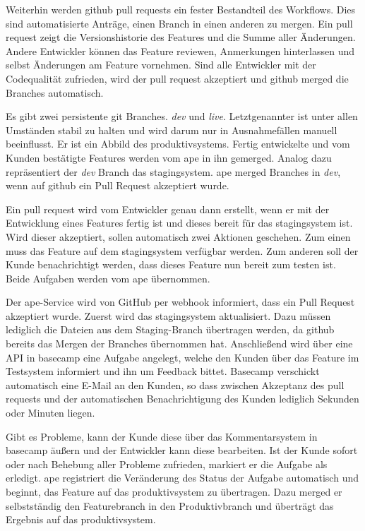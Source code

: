Weiterhin werden \gls{github} \glspl{pull request} ein fester Bestandteil des Workflows. Dies sind automatisierte Anträge, einen Branch in einen anderen zu mergen. Ein \gls{pull request} zeigt die Versionshistorie des Features und die Summe aller Änderungen. Andere Entwickler können das Feature reviewen, Anmerkungen hinterlassen und selbst Änderungen am Feature vornehmen. Sind alle Entwickler mit der Codequalität zufrieden, wird der \gls{pull request} akzeptiert und \gls{github} merged die Branches automatisch.

Es gibt zwei persistente \gls{git} Branches. \emph{dev} und \emph{live}. Letztgenannter ist unter allen Umständen stabil zu halten und wird darum nur in Ausnahmefällen manuell beeinflusst. Er ist ein Abbild des \gls{produktivsystem}s. Fertig entwickelte und vom Kunden bestätigte Features werden vom \gls{ape} in ihn gemerged. Analog dazu repräsentiert der \emph{dev} Branch das \gls{stagingsystem}. \gls{ape} merged Branches in \emph{dev}, wenn auf \gls{github} ein Pull Request akzeptiert wurde.

Ein \gls{pull request} wird vom Entwickler genau dann erstellt, wenn er mit der Entwicklung eines Features fertig ist und dieses bereit für das \gls{stagingsystem} ist. Wird dieser akzeptiert, sollen automatisch zwei Aktionen geschehen. Zum einen muss das Feature auf dem \gls{stagingsystem} verfügbar werden. Zum anderen soll der Kunde benachrichtigt werden, dass dieses Feature nun bereit zum testen ist. Beide Aufgaben werden vom \gls{ape} übernommen.

Der \gls{ape}-Service wird von GitHub per \Gls{webhook} informiert, dass ein Pull Request akzeptiert wurde. Zuerst wird das \gls{stagingsystem} aktualisiert. Dazu müssen lediglich die Dateien aus dem Staging-Branch übertragen werden, da \gls{github} bereits das Mergen der Branches übernommen hat. Anschließend wird über eine API in \gls{basecamp} eine Aufgabe angelegt, welche den Kunden über das Feature im Testsystem informiert und ihn um Feedback bittet. Basecamp verschickt automatisch eine E-Mail an den Kunden, so dass zwischen Akzeptanz des \glspl{pull request} und der automatischen Benachrichtigung des Kunden lediglich Sekunden oder Minuten liegen.

Gibt es Probleme, kann der Kunde diese über das Kommentarsystem in \gls{basecamp} äußern und der Entwickler kann diese bearbeiten. Ist der Kunde sofort oder nach Behebung aller Probleme zufrieden, markiert er die Aufgabe als erledigt. \gls{ape} registriert die Veränderung des Status der Aufgabe automatisch und beginnt, das Feature auf das \gls{produktivsystem} zu übertragen. Dazu merged er selbstständig den Featurebranch in den Produktivbranch und überträgt das Ergebnis auf das \gls{produktivsystem}.

